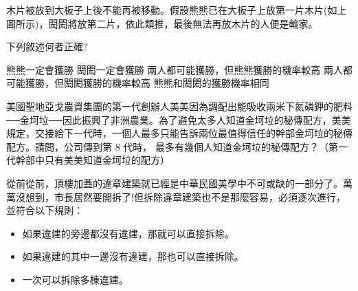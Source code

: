 \documentclass[a4paper, 12pt, addpoints]{exam}
\begin{document}
\begin{questions}
    木片被放到大板子上後不能再被移動。假設熊熊已在大板子上放第一片木片(如上圖所示)，閎閎將放第二片，依此類推，最後無法再放木片的人便是輸家。

    下列敘述何者正確?

    \begin{choices}
        \choice 熊熊一定會獲勝
        \choice 閎閎一定會獲勝
        \choice 兩人都可能獲勝，但熊熊獲勝的機率較高
        \choice 兩人都可能獲勝，但閎閎獲勝的機率較高
        \choice 熊熊和閎閎的獲勝機率相同
    \end{choices}

    \question[4] 美國聖地亞戈農資集團的第⼀代創辦人美美因為調配出能吸收兩米下氮磷鉀的肥料──金坷垃──因此振興了非洲農業。為了避免太多人知道金坷垃的秘傳配方，美美規定，交接給下一代時，一個人最多只能告訴兩位最值得信任的幹部金坷垃的秘傳配方。請問，公司傳到第 8 代時， 最多有幾個人知道金坷垃的秘傳配方？（第一代幹部中只有美美知道金坷垃的配方）

    \begin{choices}
    \end{choices}

    \question[4] 從前從前，頂樓加蓋的違章建築就已經是中華民國美學中不可或缺的一部分了。萬萬沒想到，市長居然要開拆了!但拆除違章建築也不是那麼容易，必須逐次進行，並符合以下規則：

    \begin{itemize}
        \item 如果違建的旁邊都沒有違建，那就可以直接拆除。


        \item 如果違建的其中一邊沒有違建，那也可以直接拆除。


        \item 一次可以拆除多棟違建。



\end{itemize}
\end{questions}
\end{document}
